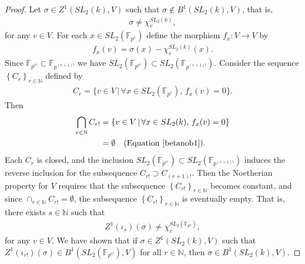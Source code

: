 \documentclass[12pt]{amsart}
\numberwithin{equation}{section}
\theoremstyle{definition}
\theoremstyle{remark}
\theoremstyle{remark}
\begin{document}
\begin{proof}
Let $\sigma\in Z^1(SL_2(k), V)$ such that $\sigma \notin B^1(SL_2(k), V)$, that is,
\begin{align}\label{betanob1}
	\sigma \neq \chi^{SL_2(k)}_v,
\end{align}
for any $v \in V$. For each $x\in SL_2(\mathbb{F}_{p^r})$ define the morphism $f_x:V\rightarrow V$ by
	\begin{align*}
		f_x(v) = \sigma(x) - \chi^{SL_2(k)}_v(x).
	\end{align*}
Since $\mathbb{F}_{p^{r!}} \subset \mathbb{F}_{p^{(r+1)!}}$ we have $SL_2(\mathbb{F}_{p^{r!}}) \subset SL_2(\mathbb{F}_{p^{(r+1)!}})$.
Consider the sequence $\left\{C_{r}\right\}_{r \in \mathbb{N}}$ defined by
	\begin{align*}
		C_{r} = \{v \in V \,|\,\forall x\in SL_2(\mathbb{F}_{p^{r}}),\, f_x(v) = 0\}.
	\end{align*}
	Then
\begin{align*}
	\bigcap_{r\in \mathbb{N}}C_{r!} &= \{v \in V \,|\, \forall x \in SL_2(k),\, f_x(v) = 0\} \\
		&= \emptyset \quad(\textrm{Equation \ref{betanob1}}).
\end{align*}
	Each $C_{r}$ is closed, and the inclusion $SL_2(\mathbb{F}_{p^{r!}}) \subset SL_2(\mathbb{F}_{p^{(r+1)!}})$ induces the reverse inclusion for the subsequence $C_{r!} \supset C_{(r+1)!}$.
Then the Noetherian property for $V$ requires that the subsequence $\left\{C_{r!}\right\}_{r \in \mathbb{N}}$ becomes constant, and since $\cap_{r\in\mathbb{N}}C_{r!} = \emptyset$, the subsequence $\left\{C_{r!}\right\}_{r \in \mathbb{N}}$ is eventually empty.
That is, there exists $s\in\mathbb{N}$ such that
	\begin{align*}
		Z^1(\iota_s)(\sigma) \neq \chi_v^{SL_2(\mathbb{F}_{p^{s}})},
	\end{align*}
	for any $v \in V$. We have shown that if $\sigma \in Z^1(SL_2(k), V)$ such that $Z^1(\iota_{r!})(\sigma) \in B^1(SL_2(\mathbb{F}_{p^{r!}}), V)$ for all $r \in \mathbb{N}$, then $\sigma \in B^1(SL_2(k), V)$.


\end{proof}
\end{document}
